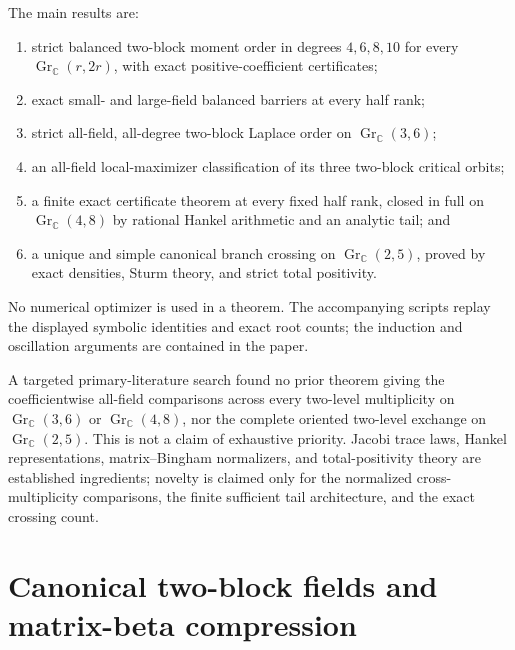 \documentclass[11pt]{article}
\newcommand{\C}{\mathbb C}
\newcommand{\Gr}{\operatorname{Gr}}
\begin{document}
The main results are:
\begin{enumerate}[label=(\roman*)]
\item strict balanced two-block moment order in degrees $4,6,8,10$ for every
      $\Gr_{\C}(r,2r)$, with exact positive-coefficient certificates;
\item exact small- and large-field balanced barriers at every half rank;
\item strict all-field, all-degree two-block Laplace order on
      $\Gr_{\C}(3,6)$;
\item an all-field local-maximizer classification of its three two-block
      critical orbits;
\item a finite exact certificate theorem at every fixed half rank, closed in
      full on $\Gr_{\C}(4,8)$ by rational Hankel arithmetic and an analytic
      tail; and
\item a unique and simple canonical branch crossing on $\Gr_{\C}(2,5)$,
      proved by exact densities, Sturm theory, and strict total positivity.
\end{enumerate}
No numerical optimizer is used in a theorem.  The accompanying scripts replay
the displayed symbolic identities and exact root counts; the induction and
oscillation arguments are contained in the paper.

A targeted primary-literature search found no prior theorem giving the
coefficientwise all-field comparisons across every two-level multiplicity on
$\Gr_{\C}(3,6)$ or $\Gr_{\C}(4,8)$, nor the complete oriented two-level
exchange on $\Gr_{\C}(2,5)$.  This is not a claim of exhaustive priority.
Jacobi trace laws, Hankel representations, matrix--Bingham normalizers, and
total-positivity theory are established ingredients; novelty is claimed only
for the normalized cross-multiplicity comparisons, the finite sufficient
tail architecture, and the exact crossing count.

\section{Canonical two-block fields and matrix-beta compression}
\end{document}
